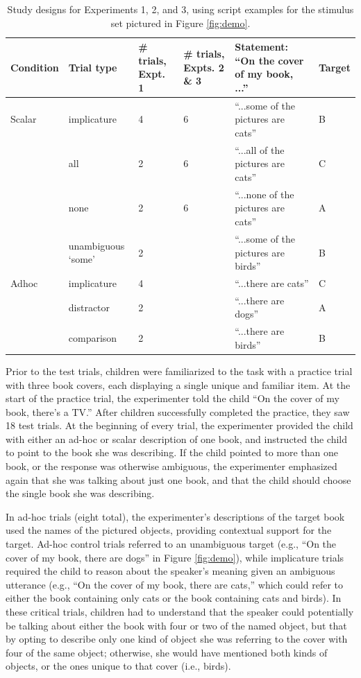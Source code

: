 \documentclass[man]{apa2}
\begin{document}
 \begin{table}
 \footnotesize
 \centering
     \begin{tabular}{C{1.5cm} C{2cm} C{1.5cm} C{1.5cm} C{4.5cm} C{1.5cm}}
                      \hline
       \null   Condition  & Trial type & \# trials, Expt. 1 & \# trials, Expts. 2 \& 3 & Statement: ``On the cover of my book, ...'' & Target   \\
       \hline
            Scalar & implicature & 4 & 6 &  ``...some of the pictures are cats'' & B	 \\
          & all  & 2 &  6 & ``...all of the pictures are cats'' & C		                 \\
           & none  & 2 & 6 & ``...none of the pictures are cats'' & A			\\
               & unambiguous `some' 	&  2 &  & ``...some of the pictures are birds'' & B					        \\
	\hline
	    Adhoc       & implicature & 4 &  & ``...there are cats'' & C 		\\
	     & distractor & 2 &  & ``...there are dogs'' & A	     \\
          & comparison & 2 &  & ``...there are birds'' & B 	   \\
       \hline
     \end{tabular}
     \caption{Study designs for Experiments 1, 2, and 3, using script examples for the stimulus set pictured in Figure \ref{fig:demo}. \label{tab:scripts} }
 \end{table}


Prior to the test trials, children were familiarized to the task with a practice trial with three book covers, each displaying a single unique and familiar item. At the start of the practice trial, the experimenter told the child ``On the cover of my book, there's a TV.'' After children successfully completed the practice, they saw 18 test trials. At the beginning of every trial, the experimenter provided the child with either an ad-hoc or scalar description of one book, and instructed the child to point to the book she was describing. If the child pointed to more than one book, or the response was otherwise ambiguous, the experimenter emphasized again that she was talking about just one book, and that the child should choose the single book she was describing.

In ad-hoc trials (eight total), the experimenter's descriptions of the target book used the names of the pictured objects, providing contextual support for the target. Ad-hoc control trials referred to an unambiguous target (e.g., ``On the cover of my book, there are dogs'' in Figure \ref{fig:demo}), while implicature trials required the child to reason about the speaker's meaning given an ambiguous utterance (e.g., ``On the cover of my book, there are cats,'' which could refer to either the book containing only cats or the book containing cats and birds). In these critical trials, children had to understand that the speaker could potentially be talking about either the book with four or two of the named object, but that by opting to describe only one kind of object she was referring to the cover with four of the same object; otherwise, she would have mentioned both kinds of objects, or the ones unique to that cover (i.e., birds).
\end{document}
